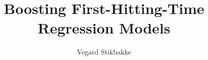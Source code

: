 \documentclass[a4paper]{memoir}
\title{Boosting First-Hitting-Time Regression Models}
\author
{
    Vegard Stikbakke
}
\begin{document}
    \frontmatter        %

    \begin{titlingpage}
        \maketitle
    \end{titlingpage}

    
    

    \cleartorecto
    \tableofcontents    %
    \cleartorecto
    \listoffigures      %
    \cleartorecto
    \listoftables       %

    \mainmatter         %

    


    

    \appendix           %
    \appendixpage       %

    

    \backmatter         %

    \printbibliography
\end{document}
